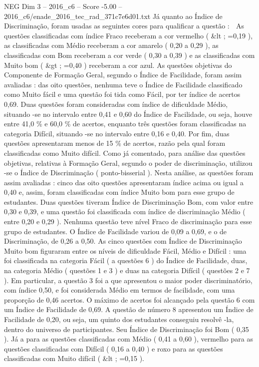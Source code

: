 \begin{textsample}{NEG Dim 3 – 2016\_c6 – Score -5.00 – 2016\_c6/enade\_2016\_tec\_rad\_371c7e6d01.txt}
Já quanto ao Índice de Discriminação, foram usadas as seguintes cores para qualificar a questão :  As questões classificadas com índice Fraco receberam a cor vermelho ( \&lt ; =0,19 ), as classificadas com Médio receberam a cor amarelo ( 0,20 a 0,29 ), as classificadas com Bom receberam a cor verde ( 0,30 a 0,39 ) e as classificadas com Muito bom ( \&gt ; =0,40 ) receberam a cor azul.
As questões objetivas do Componente de Formação Geral, segundo o Índice de Facilidade, foram assim avaliadas : das oito questões, nenhuma teve o Índice de Facilidade classificado como Muito fácil e uma questão foi tida como Fácil, por ter índice de acertos 0,69.
Duas questões foram consideradas com índice de dificuldade Médio, situando -se no intervalo entre 0,41 e 0,60 do Índice de Facilidade, ou seja, houve entre 41,0 \% e 60,0 \% de acertos, enquanto três questões foram classificadas na categoria Difícil, situando -se no intervalo entre 0,16 e 0,40.
Por fim, duas questões apresentaram menos de 15 \% de acertos, razão pela qual foram classificadas como Muito difícil.
Como já comentado, para análise das questões objetivas, relativas à Formação Geral, segundo o poder de discriminação, utilizou -se o Índice de Discriminação ( ponto-bisserial ).
Nesta análise, as questões foram assim avaliadas : cinco das oito questões apresentaram índice acima ou igual a 0,40 e, assim, foram classificadas com índice Muito bom para esse grupo de estudantes.
Duas questões tiveram Índice de Discriminação Bom, com valor entre 0,30 e 0,39, e uma questão foi classificada com índice de discriminação Médio ( entre 0,20 e 0,29 ).
Nenhuma questão teve nível Fraco de discriminação para esse grupo de estudantes.
O Índice de Facilidade variou de 0,09 a 0,69, e o de Discriminação, de 0,26 a 0,50.
As cinco questões com Índice de Discriminação Muito bom figuraram entre os níveis de dificuldade Fácil, Médio e Difícil : uma foi classificada na categoria Fácil ( a questões 6 ) do Índice de Facilidade, duas, na categoria Médio ( questões 1 e 3 ) e duas na categoria Difícil ( questões 2 e 7 ).
Em particular, a questão 3 foi a que apresentou o maior poder discriminatório, com índice 0,50, e foi considerada Médio em termos de facilidade, com uma proporção de 0,46 acertos.
O máximo de acertos foi alcançado pela questão 6 com um Índice de Facilidade de 0,69.
A questão de número 8 apresentou um Índice de Facilidade de 0,20, ou seja, um quinto dos estudantes conseguiu resolvê -la, dentro do universo de participantes.
Seu Índice de Discriminação foi Bom ( 0,35 ).
Já a para as questões classificadas com Médio ( 0,41 a 0,60 ), vermelho para as questões classificadas com Difícil ( 0,16 a 0,40 ) e roxo para as questões classificadas com Muito difícil ( \&lt ; =0,15 ).

\end{textsample}
